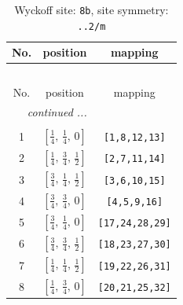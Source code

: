 \documentclass[fleqn,8pt]{jsarticle}
\begin{document}
\begin{longtable}{ccc}
\caption{Wyckoff site: {\tt 8b}, site symmetry: {\tt ..2/m}}
 \\
 \hline \hline
No. & position & mapping \\ \hline \endfirsthead

\multicolumn{2}{l}{\tablename\ \thetable{}} \\
 \hline \hline
No. & position & mapping \\ \hline \endhead

 \hline \hline
\multicolumn{2}{r}{\footnotesize\it continued ...} \\ \endfoot

 \hline \hline
\multicolumn{2}{r}{} \\ \endlastfoot

1 & $\left[ \frac{1}{4},\, \frac{1}{4},\, 0 \right]$ & {\tt [1,8,12,13]} \\ \hline
2 & $\left[ \frac{1}{4},\, \frac{3}{4},\, \frac{1}{2} \right]$ & {\tt [2,7,11,14]} \\ \hline
3 & $\left[ \frac{3}{4},\, \frac{1}{4},\, \frac{1}{2} \right]$ & {\tt [3,6,10,15]} \\ \hline
4 & $\left[ \frac{3}{4},\, \frac{3}{4},\, 0 \right]$ & {\tt [4,5,9,16]} \\ \hline
5 & $\left[ \frac{3}{4},\, \frac{1}{4},\, 0 \right]$ & {\tt [17,24,28,29]} \\ \hline
6 & $\left[ \frac{3}{4},\, \frac{3}{4},\, \frac{1}{2} \right]$ & {\tt [18,23,27,30]} \\ \hline
7 & $\left[ \frac{1}{4},\, \frac{1}{4},\, \frac{1}{2} \right]$ & {\tt [19,22,26,31]} \\ \hline
8 & $\left[ \frac{1}{4},\, \frac{3}{4},\, 0 \right]$ & {\tt [20,21,25,32]} \\
\end{longtable}
\renewcommand{\arraystretch}{1.2}
\end{document}
